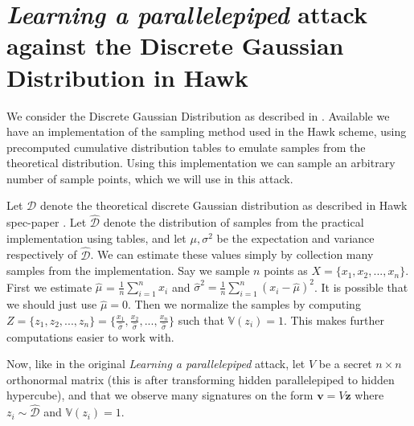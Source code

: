 \documentclass[12 pt]{article}        	%
\newcommand{\mat}[1]{\mathit{#1}}
\renewcommand{\vec}[1]{\mathbf{#1}}
\newcommand{\bb}[1]{\mathbb{#1}}
\newcommand{\dgd}{\mathcal{D}}
\newcommand{\dgdi}{\widehat{\mathcal{D}}}
\begin{document}
\title{}
\author{Eirik D. Skjerve}
\maketitle
\section{\textit{Learning a parallelepiped} attack against the Discrete Gaussian Distribution in Hawk}
We consider the Discrete Gaussian Distribution as described in \cite{HawkSpec24}. Available we have an implementation of the sampling method used in the Hawk scheme,
using precomputed cumulative distribution tables to emulate samples from the theoretical distribution. Using this implementation we can sample an arbitrary number of sample points, which we will use in this attack. \\ \hfill \break

Let $\dgd$ denote the theoretical discrete Gaussian distribution as described in Hawk spec-paper \cite{HawkSpec24}.
Let $\dgdi$ denote the distribution of samples from the practical implementation using tables,
and let $\mu, \sigma ^2$ be the expectation and variance respectively of $\dgdi$. We can estimate these values simply by collection many samples from the implementation.
Say we sample $n$ points as $X = \{x_1, x_2,..., x_n\}$. First we estimate $\hat{\mu}$ = $\frac{1}{n}\sum_{i=1}^{n} x_i$ and $\hat{\sigma}^2 = \frac{1}{n}\sum_{i=1}^{n}(x_i - \hat{\mu})^2$.
It is possible that we should just use $\hat{\mu} = 0$. Then we normalize the samples by computing 
$Z = \{z_1, z_2,..., z_n\} = \{\frac{x_1}{\hat{\sigma}}, \frac{x_2}{\hat{\sigma}},..., \frac{x_n}{\hat{\sigma}}\} $ such that $\bb{V}(z_i) = 1$. This makes further computations easier to work with. \\ \hfill \break

Now, like in the original \textit{Learning a parallelepiped} attack, let $\mat{V}$ be a secret $n \times n$ orthonormal matrix (this is after transforming hidden parallelepiped to hidden hypercube),
and that we observe many signatures on the form $\vec{v} = \mat{V}\vec{z}$ where $z_i \sim \dgdi$ and $\bb{V}(z_i) = 1$.
\end{document}
